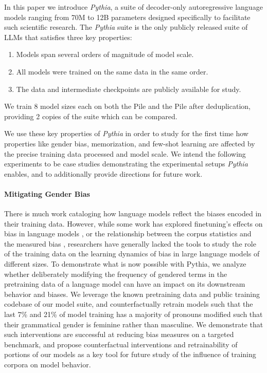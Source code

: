 In this paper we introduce \textit{Pythia}, a suite of decoder-only autoregressive language models ranging from 70M to 12B parameters designed specifically to facilitate such scientific research. The \textit{Pythia} suite is the only publicly released suite of LLMs that satisfies three key properties:

\begin{enumerate}
    \item Models span several orders of magnitude of model scale.
    \item All models were trained on the same data in the same order.
    \item The data and intermediate checkpoints are publicly available for study.
\end{enumerate}

We train 8 model sizes each on both the Pile \cite{gao2020pile,biderman2022datasheet} and the Pile after deduplication, providing 2 copies of the suite which can be compared.

We use these key properties of \textit{Pythia} in order to study for the first time how properties like gender bias, memorization, and few-shot learning are affected by the precise training data processed and model scale. We intend the following experiments to be case studies demonstrating the experimental setups \textit{Pythia} enables, and to additionally provide directions for future work.

\paragraph{Mitigating Gender Bias} There is much work cataloging how language models reflect the biases encoded in their training data. However, while some work has explored finetuning's effects on bias in language models \citep{gira2022debiasing,kirtane2022efficient,choenni2021stepmothers}, or the relationship between the corpus statistics and the measured bias \citep{bordia2019identifying,wal2022birth}, researchers have generally lacked the tools to study the role of the training data on the learning dynamics of bias in large language models of different sizes. To demonstrate what is now possible with Pythia, we analyze whether deliberately modifying the frequency of gendered terms in the pretraining data of a language model can have an impact on its downstream behavior and biases. We leverage the known pretraining data and public training codebase of our model suite, and counterfactually retrain models such that the last 7\% and 21\% of model training has a majority of pronouns modified such that their grammatical gender is feminine rather than masculine. We demonstrate that such interventions are successful at reducing bias measures on a targeted benchmark, and propose counterfactual interventions and retrainability of portions of our models as a key tool for future study of the influence of training corpora on model behavior.

